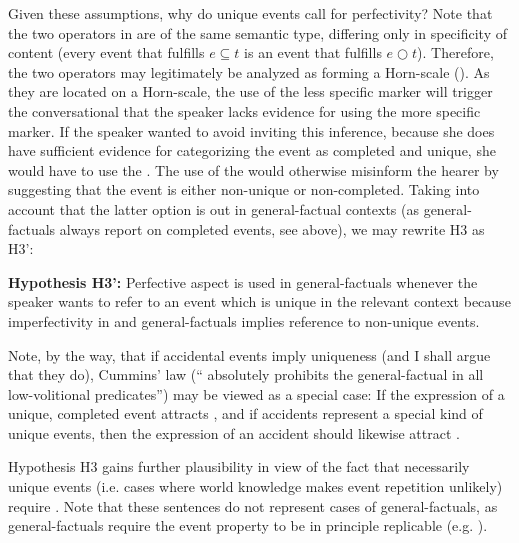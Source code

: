 \documentclass[output=paper,modfonts,newtxmath,hidelinks]{langscibook}
\begin{document}
Given these assumptions, why do unique events call for perfectivity? Note that the two operators in  are of the same semantic type,
differing only in specificity of content (every event that fulfills $e \subseteq t$ is an event that fulfills $e \bigcirc t$).
Therefore, the two  operators may legitimately be analyzed as forming a 
Horn-scale (\citealt{Sonne06,Sonne07}). As they are located on a Horn-scale, the use 
of the less specific  marker will trigger the conversational  that the speaker 
lacks evidence for using the more specific  marker. If the speaker wanted to avoid inviting this inference, because she does have 
sufficient evidence for categorizing the event as completed and unique, she would have to use the . The use of the  
would otherwise misinform the hearer by suggesting that the event is either non-unique or non-completed. Taking into account that the latter option is out in general-factual contexts (as general-factuals always report on completed events, see above), we may rewrite H3 as H3':

\begin{exe}
\ex\label{13:hypo3bar}
\textbf{Hypothesis H3':} Perfective aspect is used in general-factuals whenever the speaker wants to refer to an event which is unique in the relevant context because imperfectivity in  and  general-factuals implies reference to non-unique events. 
\end{exe}

\noindent Note, by the way, that if accidental events imply uniqueness (and I shall argue that they do), Cummins' law (`` absolutely prohibits the general-factual  in all low-volitional predicates'') may be viewed as a special case:
If the expression of a unique, completed event attracts , and if accidents represent a special kind of unique events, 
then the expression of an accident should likewise attract . 

Hypothesis H3 gains further plausibility in view of the fact that necessarily unique events (i.e. cases where world knowledge makes 
event repetition unlikely) require . Note that these sentences do not represent cases of general-factuals, as general-factuals require the event property to be in principle replicable 
(e.g. \citealt[58]{Padu1996}). 
\end{document}
